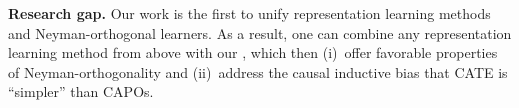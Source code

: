 \textbf{Research gap.} Our work is the first to unify representation learning methods and Neyman-orthogonal learners. As a result, one can combine any representation learning method from above with our \ORlearners, which then (i)~offer favorable properties of Neyman-orthogonality and (ii)~address the causal inductive bias that CATE is ``simpler'' than CAPOs. 

